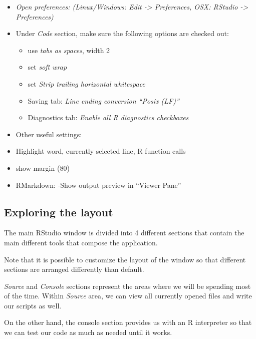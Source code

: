 \documentclass[]{article}
\providecommand{\tightlist}{%
  \setlength{\itemsep}{0pt}\setlength{\parskip}{0pt}}
\begin{document}
\begin{itemize}
\item
  \emph{Open preferences: (Linux/Windows: Edit -\textgreater{}
  Preferences, OSX: RStudio -\textgreater{} Preferences)}
\item
  Under \emph{Code} section, make sure the following options are checked
  out:

  \begin{itemize}
  \tightlist
  \item
    use \emph{tabs as spaces}, width 2
  \item
    set \emph{soft wrap}
  \item
    set \emph{Strip trailing horizontal whitespace}
  \item
    Saving tab: \emph{Line ending conversion ``Posix (LF)''}
  \item
    Diagnostics tab: \emph{Enable \emph{all} R diagnostics checkboxes}
  \end{itemize}
\item
  Other useful settings:
\item
  Highlight word, currently selected line, R function calls
\item
  show margin (80)
\item
  RMarkdown: -Show output preview in ``Viewer Pane''
\end{itemize}

\subsection{Exploring the layout}\label{exploring-the-layout}

The main RStudio window is divided into 4 different sections that
contain the main different tools that compose the application.

Note that it is possible to customize the layout of the window so that
different sections are arranged differently than default.

\emph{Source} and \emph{Console} sections represent the areas where we
will be spending most of the time. Within \emph{Source} area, we can
view all currently opened files and write our scripts as well.

On the other hand, the console section provides us with an R interpreter
so that we can test our code as much as needed until it works.
\end{document}
